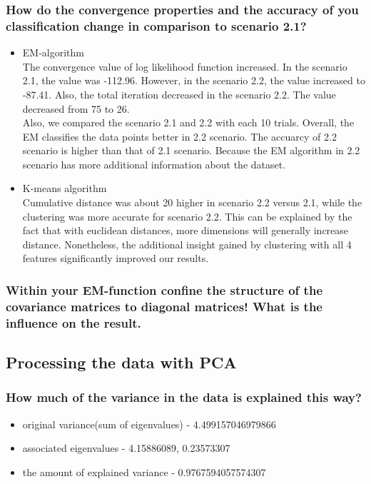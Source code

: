 \documentclass[a4paper]{article}
\begin{document}
\clearpage

	\subsubsection{How do the convergence properties and the accuracy of you classification change in comparison to scenario 2.1? }
	\begin{itemize}
		\item EM-algorithm \\
		The convergence value of log likelihood function increased. In the scenario 2.1, the value was -112.96. However, in the scenario 2.2, the value increased to -87.41. Also, the total iteration decreased in the scenario 2.2. The value decreased from 75 to 26.\\
		Also, we compared the scenario 2.1 and 2.2 with each 10 trials. Overall, the EM classifies the data points better in 2.2 scenario. The accuarcy of 2.2 scenario is higher than that of 2.1 scenario. Because the EM algorithm in 2.2 scenario has more additional information about the dataset.
		
		\item K-means algorithm \\
		Cumulative distance was about 20 higher in scenario 2.2 versus 2.1, while the clustering was more accurate for scenario 2.2.  This can be explained by the fact that with euclidean distances, more dimensions will generally increase distance.  Nonetheless, the additional insight gained by clustering with all 4 features significantly improved our results.
		 
	\end{itemize}
	
	\subsubsection{Within your EM-function confine the structure of the covariance matrices to diagonal matrices! What is the influence on the result.}
        \clearpage
	\subsection{Processing the data with PCA }
	\subsubsection{How much of the variance in the data is explained this way?}
        \begin{itemize}
          \item original variance(sum of eigenvalues) -  4.499157046979866
          \item associated eigenvalues - 4.15886089, 0.23573307
          \item the amount of explained variance - 0.9767594057574307
        \end{itemize}
\end{document}
